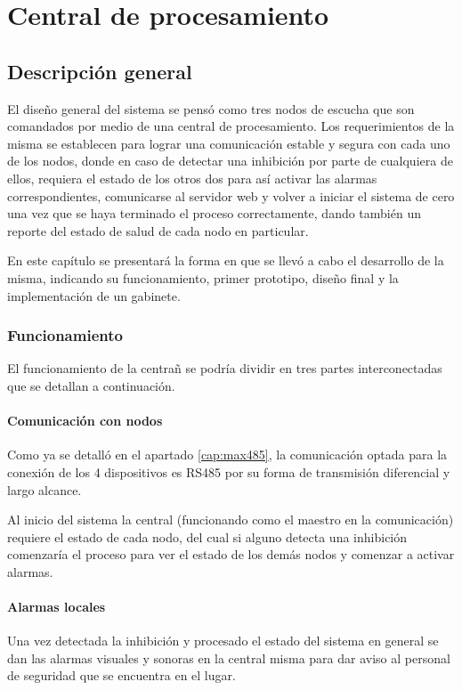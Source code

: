 \chapter{Central de procesamiento}
\section{Descripción general}
\par El diseño general del sistema se pensó como tres nodos de escucha que son comandados
por medio de una central de procesamiento. Los requerimientos de la misma se
establecen para lograr una comunicación estable y segura con cada uno
de los nodos, donde en caso de detectar una inhibición por parte de cualquiera de ellos, requiera
el estado de los otros dos para así activar las alarmas correspondientes, comunicarse al
servidor web y volver a iniciar el sistema de cero una vez que se haya terminado el proceso
correctamente, dando también un reporte del estado de salud de cada nodo en particular.
\par En este capítulo se presentará la forma en que se llevó a cabo el desarrollo de la
misma, indicando su funcionamiento, primer prototipo, diseño final y la implementación de
un gabinete. 
\subsection{Funcionamiento}
\par El funcionamiento de la centrañ se podría dividir en tres partes interconectadas que se detallan a continuación.
\subsubsection{Comunicación con nodos}

\par Como ya se detalló en el apartado \ref{cap:max485}, la comunicación optada para la conexión de los 4 dispositivos es RS485 por su forma de transmisión diferencial y largo alcance. 
\par Al inicio del sistema la central (funcionando como el maestro en la comunicación) requiere el estado de cada nodo, del cual si alguno detecta una inhibición comenzaría el proceso para ver el estado de los demás nodos y comenzar a activar alarmas.

\subsubsection{Alarmas locales}
\par Una vez detectada la inhibición y procesado el estado del sistema en general se dan las alarmas visuales y sonoras en la central misma para dar aviso al personal de seguridad que se encuentra en el lugar. 

